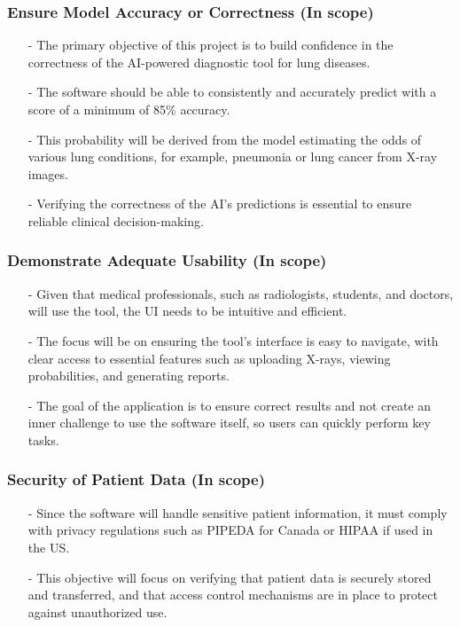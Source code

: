\documentclass[12pt, titlepage]{article}
\begin{document}
    \subsubsection{Ensure Model Accuracy or Correctness (In scope)}
    \begin{itemize}
        \item[-] The primary objective of this project is to build confidence in the correctness of the AI-powered diagnostic tool for lung diseases.
        \item[-] The software should be able to consistently and accurately predict with a score of a minimum of 85\% accuracy.
        \item[-] This probability will be derived from the model estimating the odds of various lung conditions, for example, pneumonia or lung cancer from X-ray images.
        \item[-] Verifying the correctness of the AI's predictions is essential to ensure reliable clinical decision-making.
    \end{itemize}
    
    \subsubsection{Demonstrate Adequate Usability (In scope)}
    \begin{itemize}
        \item[-] Given that medical professionals, such as radiologists, students, and doctors, will use the tool, the UI needs to be intuitive and efficient.
        \item[-] The focus will be on ensuring the tool’s interface is easy to navigate, with clear access to essential features such as uploading X-rays, viewing probabilities, and generating reports.
        \item[-] The goal of the application is to ensure correct results and not create an inner challenge to use the software itself, so users can quickly perform key tasks.
    \end{itemize}
    
    \subsubsection{Security of Patient Data (In scope)}
    \begin{itemize}
        \item[-] Since the software will handle sensitive patient information, it must comply with privacy regulations such as PIPEDA for Canada or HIPAA if used in the US.
        \item[-] This objective will focus on verifying that patient data is securely stored and transferred, and that access control mechanisms are in place to protect against unauthorized use.
    \end{itemize}
    
\end{document}
